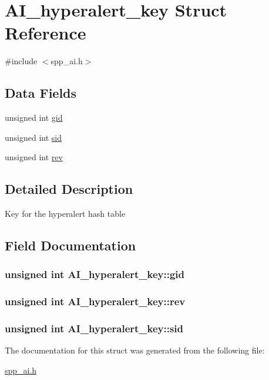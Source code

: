 \hypertarget{structAI__hyperalert__key}{
\section{AI\_\-hyperalert\_\-key Struct Reference}
\label{structAI__hyperalert__key}
}


{\ttfamily \#include $<$spp\_\-ai.h$>$}

\subsection*{Data Fields}
\begin{DoxyCompactItemize}
\item 
unsigned int \hyperlink{structAI__hyperalert__key_a711afeb45b534480e85bf9abe569a602}{gid}
\item 
unsigned int \hyperlink{structAI__hyperalert__key_a854676c9125ae0aeaeaef2b201ce542f}{sid}
\item 
unsigned int \hyperlink{structAI__hyperalert__key_a3aa6fed74469f1f2c08573c5d7298670}{rev}
\end{DoxyCompactItemize}


\subsection{Detailed Description}
Key for the hyperalert hash table 

\subsection{Field Documentation}
\hypertarget{structAI__hyperalert__key_a711afeb45b534480e85bf9abe569a602}{
\subsubsection[{gid}]{\setlength{\rightskip}{0pt plus 5cm}unsigned int {\bf AI\_\-hyperalert\_\-key::gid}}}
\label{structAI__hyperalert__key_a711afeb45b534480e85bf9abe569a602}
\hypertarget{structAI__hyperalert__key_a3aa6fed74469f1f2c08573c5d7298670}{
\subsubsection[{rev}]{\setlength{\rightskip}{0pt plus 5cm}unsigned int {\bf AI\_\-hyperalert\_\-key::rev}}}
\label{structAI__hyperalert__key_a3aa6fed74469f1f2c08573c5d7298670}
\hypertarget{structAI__hyperalert__key_a854676c9125ae0aeaeaef2b201ce542f}{
\subsubsection[{sid}]{\setlength{\rightskip}{0pt plus 5cm}unsigned int {\bf AI\_\-hyperalert\_\-key::sid}}}
\label{structAI__hyperalert__key_a854676c9125ae0aeaeaef2b201ce542f}


The documentation for this struct was generated from the following file:\begin{DoxyCompactItemize}
\item 
\hyperlink{spp__ai_8h}{spp\_\-ai.h}\end{DoxyCompactItemize}
